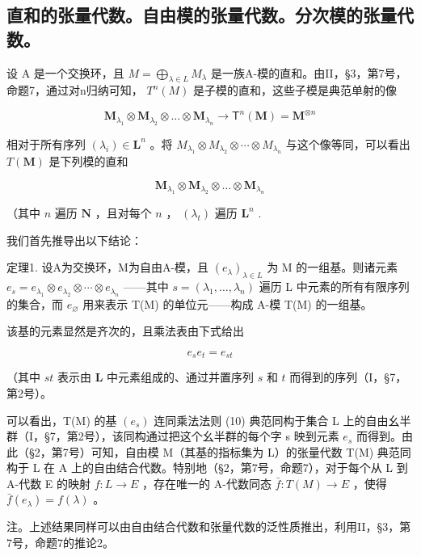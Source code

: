 \subsection{直和的张量代数。自由模的张量代数。分次模的张量代数。}

设 A 是一个交换环，且 \(M = \bigoplus_{\lambda \in L} M_{\lambda}\) 是一族A-模的直和。由II，§3，第7号，命题7，通过对n归纳可知， \(T^{n}(M)\) 是子模的直和，这些子模是典范单射的像

\[
\mathbf {M} _ {\lambda_ {1}} \otimes \mathbf {M} _ {\lambda_ {2}} \otimes \dots \otimes \mathbf {M} _ {\lambda_ {n}} \rightarrow \mathsf {T} ^ {n} (\mathbf {M}) = \mathbf {M} ^ {\otimes n}
\]

相对于所有序列 \((\lambda_{i})\in\mathbf{L}^{n}\) 。将 \(M_{\lambda_{1}}\otimes M_{\lambda_{2}}\otimes\cdots\otimes M_{\lambda_{n}}\) 与这个像等同，可以看出 \(T(\mathbf{M})\) 是下列模的直和

\[
\mathbf {M} _ {\lambda_ {1}} \otimes \mathbf {M} _ {\lambda_ {2}} \otimes \dots \otimes \mathbf {M} _ {\lambda_ {n}}
\]

（其中 \(n\) 遍历 \(\mathbf{N}\) ，且对每个 \(n\) ， \((\lambda_t)\) 遍历 \(\mathbf{L}^n\) .

我们首先推导出以下结论：

定理1. 设A为交换环，M为自由A-模，且 \((e_{\lambda})_{\lambda \in L}\) 为 M 的一组基。则诸元素 \(e_{s} = e_{\lambda_{1}} \otimes e_{\lambda_{2}} \otimes \cdots \otimes e_{\lambda_{n}}\) ——其中 \(s = (\lambda_{1}, \ldots, \lambda_{n})\) 遍历 L 中元素的所有有限序列的集合，而 \(e_{\varnothing}\) 用来表示 T(M) 的单位元——构成 A-模 T(M) 的一组基。

该基的元素显然是齐次的，且乘法表由下式给出

\[
e _ {s} e _ {t} = e _ {s t}\tag{10}
\]

（其中 \(st\) 表示由 \(\mathbf{L}\) 中元素组成的、通过并置序列 \(s\) 和 \(t\) 而得到的序列（I，§7，第2号）。

可以看出，T(M) 的基 \((e_{s})\) 连同乘法法则 (10) 典范同构于集合 L 上的自由幺半群（I，§7，第2号），该同构通过把这个幺半群的每个字 s 映到元素 \(e_{s}\) 而得到。由此（§2，第7号）可知，自由模 M（其基的指标集为 L）的张量代数 T(M) 典范同构于 L 在 A 上的自由结合代数。特别地（§2，第7号，命题7），对于每个从 L 到 A-代数 E 的映射 \(f: L \to E\) ，存在唯一的 A-代数同态 \(\bar{f}: T(M) \to E\) ，使得 \(\bar{f}(e_{\lambda}) = f(\lambda)\) 。

注。上述结果同样可以由自由结合代数和张量代数的泛性质推出，利用II，§3，第7号，命题7的推论2。

